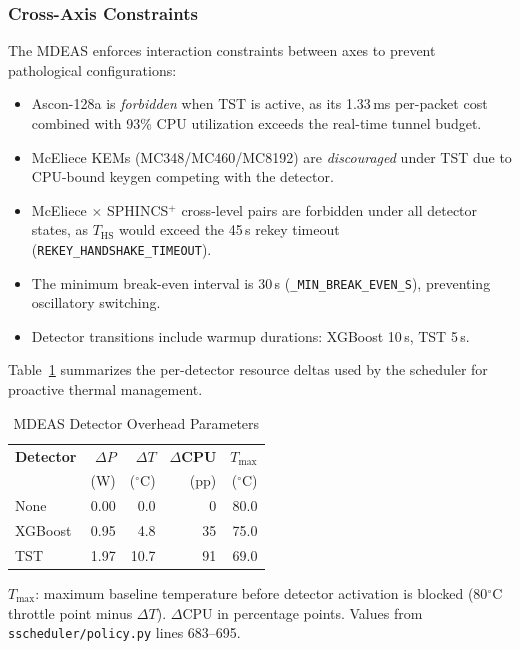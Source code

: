 \subsubsection{Cross-Axis Constraints}

The MDEAS enforces interaction constraints between axes to prevent
pathological configurations:
\begin{itemize}
\item Ascon-128a is \emph{forbidden} when TST is active, as its
  1.33\,ms per-packet cost combined with 93\% CPU utilization
  exceeds the real-time tunnel budget.
\item McEliece KEMs (MC348/MC460/MC8192) are \emph{discouraged} under
  TST due to CPU-bound keygen competing with the detector.
\item McEliece $\times$ SPHINCS$^+$ cross-level pairs are forbidden under
  all detector states, as $T_\text{HS}$ would exceed the
  45\,s rekey timeout (\texttt{REKEY\_HANDSHAKE\_TIMEOUT}).
\item The minimum break-even interval is 30\,s
  (\texttt{\_MIN\_BREAK\_EVEN\_S}), preventing oscillatory switching.
\item Detector transitions include warmup durations: XGBoost 10\,s,
  TST 5\,s.
\end{itemize}

Table~\ref{tab:detector_overhead} summarizes the per-detector resource
deltas used by the scheduler for proactive thermal management.

\begin{table}[t]
\centering
\caption{MDEAS Detector Overhead Parameters}
\label{tab:detector_overhead}
\footnotesize
\begin{tabular}{@{}lrrrr@{}}
\toprule
\textbf{Detector} &
  \textbf{$\Delta P$} & \textbf{$\Delta T$} &
  \textbf{$\Delta$CPU} & \textbf{$T_\text{max}$} \\
& (W) & ($^\circ$C) & (pp) & ($^\circ$C) \\
\midrule
None    & 0.00 & 0.0  & 0  & 80.0 \\
XGBoost & 0.95 & 4.8  & 35 & 75.0 \\
TST     & 1.97 & 10.7 & 91 & 69.0 \\
\bottomrule
\end{tabular}
\begin{tablenotes}
\footnotesize
\item $T_\text{max}$: maximum baseline temperature before detector
  activation is blocked (80$^\circ$C throttle point minus $\Delta T$).
  $\Delta$CPU in percentage points.
  Values from \texttt{sscheduler/policy.py} lines 683--695.
\end{tablenotes}
\end{table}

